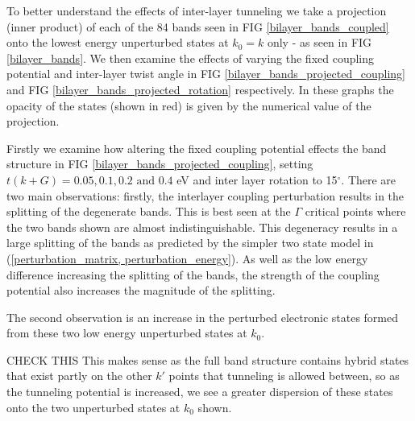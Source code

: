 \documentclass[12pt]{report} %
\begin{document}
To better understand the effects of inter-layer tunneling we take a projection (inner product) of each of the 84 bands seen in FIG \ref{bilayer_bands_coupled} onto the lowest energy unperturbed states at $k_0 = k$ only - as seen in FIG \ref{bilayer_bands}. We then examine the effects of varying the fixed coupling potential and inter-layer twist angle in FIG \ref{bilayer_bands_projected_coupling} and FIG \ref{bilayer_bands_projected_rotation} respectively. In these graphs the opacity of the states (shown in red) is given by the numerical value of the projection.

Firstly we examine how altering the fixed coupling potential effects the band structure in FIG \ref{bilayer_bands_projected_coupling}, setting $t(k+G) = 0.05, 0.1, 0.2 \text{ and } 0.4$ eV and inter layer rotation to 15$^\circ$. There are two main observations: firstly, the interlayer coupling perturbation results in the splitting of the degenerate bands. This is best seen at the $\Gamma$ critical points where the two bands shown are almost indistinguishable. This degeneracy results in a large splitting of the bands as predicted by the simpler two state model in (\ref{perturbation_matrix, perturbation_energy}). As well as the low energy difference increasing the splitting of the bands, the strength of the coupling potential also increases the magnitude of the splitting.

The second observation is an increase in the perturbed electronic states formed from these two low energy unperturbed states at $k_0$.

CHECK THIS This makes sense as the full band structure contains hybrid states that exist partly on the other $k'$ points that tunneling is allowed between, so as the tunneling potential is increased, we see a greater dispersion of these states onto the two unperturbed states at $k_0$ shown.
\end{document}
